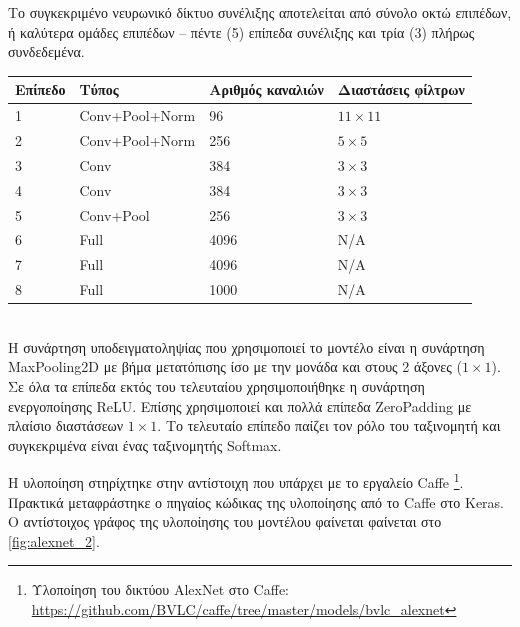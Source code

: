 Το συγκεκριμένο νευρωνικό δίκτυο συνέλιξης αποτελείται από σύνολο οκτώ επιπέδων,
ή καλύτερα ομάδες επιπέδων – πέντε (5) επίπεδα συνέλιξης και τρία (3) πλήρως συνδεδεμένα. \\

\begin{tabular}{ | l | l | l | l | }
  \hline
  \rowcolor{Gray}
  Επίπεδο  & Τύπος & Αριθμός καναλιών & Διαστάσεις φίλτρων \\
  \hline
  1 & Conv+Pool+Norm & 96 & $11 \times 11$ \\
  2 & Conv+Pool+Norm & 256 & $5 \times 5$ \\
  3 & Conv & 384 & $3 \times 3$ \\
  4 & Conv & 384 & $3 \times 3$ \\
  5 & Conv+Pool & 256 & $3 \times 3$ \\
  6 & Full & 4096 & Ν/A \\
  7 & Full & 4096 & N/A \\
  8 & Full & 1000 & N/A \\
  \hline
\end{tabular}
\\

Η συνάρτηση υποδειγματοληψίας που χρησιμοποιεί το μοντέλο είναι η συνάρτηση
MaxPooling2D με βήμα μετατόπισης ίσο με την μονάδα και στους 2 άξονες ($1 \times 1$).
Σε όλα τα επίπεδα εκτός του τελευταίου χρησιμοποιήθηκε η συνάρτηση ενεργοποίησης
ReLU. Επίσης χρησιμοποιεί και πολλά επίπεδα ZeroPadding με πλαίσιο
διαστάσεων $1 \times 1$. Το τελευταίο επίπεδο παίζει τον ρόλο του ταξινομητή και συγκεκριμένα
είναι ένας ταξινομητής Softmax.

Η υλοποίηση στηρίχτηκε στην αντίστοιχη που υπάρχει με το εργαλείο Caffe
\footnote{Υλοποίηση του δικτύου AlexNet στο Caffe: \url{https://github.com/BVLC/caffe/tree/master/models/bvlc_alexnet}}.
Πρακτικά μεταφράστηκε ο πηγαίος κώδικας της υλοποίησης από το Caffe στο Keras.
Ο αντίστοιχος γράφος της υλοποίησης του μοντέλου
φαίνεται φαίνεται στο \autoref{fig:alexnet_2}.

